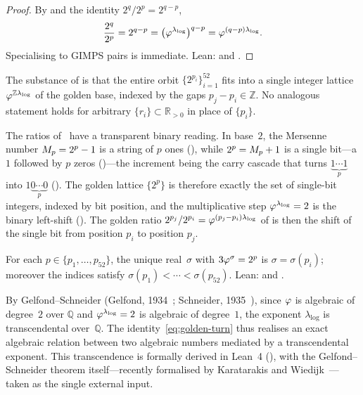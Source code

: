 \begin{proof}
By  and the identity $2^{q}/2^{p}=2^{q-p}$,
\[
  \frac{2^{q}}{2^{p}}
  = 2^{q-p}
  = \bigl(\varphi^{\lambda_{\log}}\bigr)^{q-p}
  = \varphi^{(q-p)\lambda_{\log}}.
\]
Specialising to GIMPS pairs is immediate.  Lean:
 and
.
\end{proof}

The substance of  is that the entire orbit
$\{2^{p_{i}}\}_{i=1}^{52}$ fits into a single integer lattice
$\varphi^{\mathbb{Z}\lambda_{\log}}$ of the golden base, indexed by the
gaps $p_{j}-p_{i}\in\mathbb{Z}$.  No analogous statement holds for
arbitrary $\{r_{i}\}\subset\mathbb{R}_{>0}$ in place of $\{p_{i}\}$.

\begin{Remark}\label{rem:binary}
The ratios of~ have a transparent binary reading.  In
base~$2$, the Mersenne number $M_{p}=2^{p}-1$ is a string of $p$ ones
(), while $2^{p}=M_{p}+1$ is a single bit---a $1$
followed by $p$ zeros ()---the increment
being the carry cascade that turns $\underbrace{1\cdots1}_{p}$ into
$1\underbrace{0\cdots0}_{p}$ ().  The
golden lattice $\{2^{p}\}$ is therefore exactly the set of single-bit
integers, indexed by bit position, and the multiplicative step
$\varphi^{\lambda_{\log}}=2$ is the binary left-shift
().  The golden ratio
$2^{p_{j}}/2^{p_{i}}=\varphi^{(p_{j}-p_{i})\lambda_{\log}}$ of
 is then the shift of the single bit from position
$p_{i}$ to position $p_{j}$.
\end{Remark}

\begin{Corollary}\label{cor:51}
For each $p\in\{p_{1},\ldots,p_{52}\}$, the unique real~$\sigma$ with
$3\varphi^{\sigma}=2^{p}$ is $\sigma=\sigma(p_{i})$; moreover the indices
satisfy $\sigma(p_{1})<\cdots<\sigma(p_{52})$.  Lean:
 and
.
\end{Corollary}

\begin{Remark}
\label{rem:transcendence}
By Gelfond--Schneider (Gelfond, 1934~\cite{gelfond}; Schneider,
1935~\cite{schneider}), since $\varphi$ is algebraic of degree~$2$ over
$\mathbb{Q}$ and $\varphi^{\lambda_{\log}}=2$ is algebraic of degree~$1$,
the exponent $\lambda_{\log}$ is transcendental over~$\mathbb{Q}$.  The
identity~\eqref{eq:golden-turn} thus realises an exact algebraic relation
between two algebraic numbers mediated by a transcendental exponent.  This transcendence is formally derived in
Lean~4 (), with the Gelfond--Schneider
theorem itself---recently formalised by Karatarakis and Wiedijk~\cite{karatarakis-wiedijk}---taken as the single external
input.
\end{Remark}

